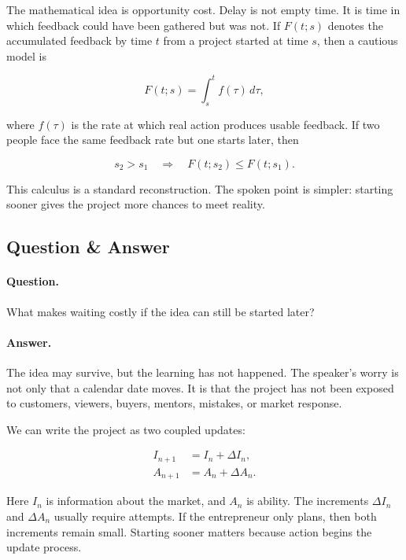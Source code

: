The mathematical idea is opportunity cost. Delay is not empty time. It is time in which feedback could have been gathered but was not. If \(F(t;s)\) denotes the accumulated feedback by time \(t\) from a project started at time \(s\), then a cautious model is

\begin{equation}
F(t;s)=\int_s^t f(\tau)\,d\tau,
\end{equation}

where \(f(\tau)\) is the rate at which real action produces usable feedback. If two people face the same feedback rate but one starts later, then

\begin{equation}
s_2>s_1
\quad\Longrightarrow\quad
F(t;s_2)\leq F(t;s_1).
\end{equation}

This calculus is a standard reconstruction. The spoken point is simpler: starting sooner gives the project more chances to meet reality.

\subsection{Question \& Answer}

\paragraph{Question.}
What makes waiting costly if the idea can still be started later?

\paragraph{Answer.}
The idea may survive, but the learning has not happened. The speaker's worry is not only that a calendar date moves. It is that the project has not been exposed to customers, viewers, buyers, mentors, mistakes, or market response.

We can write the project as two coupled updates:

\begin{align}
I_{n+1} &= I_n+\Delta I_n,\\
A_{n+1} &= A_n+\Delta A_n.
\end{align}

Here \(I_n\) is information about the market, and \(A_n\) is ability. The increments \(\Delta I_n\) and \(\Delta A_n\) usually require attempts. If the entrepreneur only plans, then both increments remain small. Starting sooner matters because action begins the update process.

